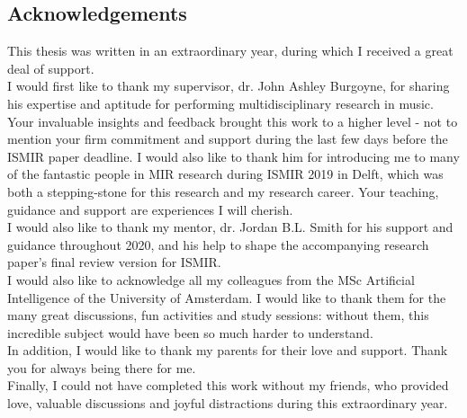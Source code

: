 
\begin{fullwidth}
    \section*{Acknowledgements}
    This thesis was written in an extraordinary year, during which I received a great deal of support.\\

    I would first like to thank my supervisor, dr. John Ashley Burgoyne, for sharing his expertise and aptitude for performing multidisciplinary research in music. Your invaluable insights and feedback brought this work to a higher level - not to mention your firm commitment and support during the last few days before the ISMIR paper deadline. I would also like to thank him for introducing me to many of the fantastic people in MIR research during ISMIR 2019 in Delft, which was both a stepping-stone for this research and my research career. Your teaching, guidance and support are experiences I will cherish.\\

    I would also like to thank my mentor, dr. Jordan B.L. Smith for his support and guidance throughout 2020, and his help to shape the accompanying research paper's final review version for ISMIR.\\

    I would also like to acknowledge all my colleagues from the MSc Artificial Intelligence of the University of Amsterdam. I would like to thank them for the many great discussions, fun activities and study sessions: without them, this incredible subject would have been so much harder to understand.\\

    In addition, I would like to thank my parents for their love and support. Thank you for always being there for me.\\
    
    Finally, I could not have completed this work without my friends, who provided love, valuable discussions and joyful distractions during this extraordinary year.\\
\end{fullwidth}
